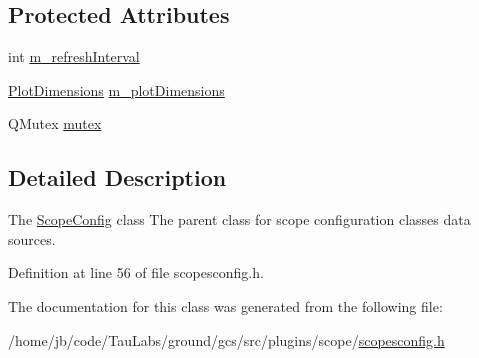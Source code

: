 \subsection*{\-Protected \-Attributes}
\begin{DoxyCompactItemize}
\item 
int \hyperlink{group___scope_plugin_gab29cf33842cdb51f7eba8bfccc93158e}{m\-\_\-refresh\-Interval}
\item 
\hyperlink{group___scope_plugin_ga51d68dee7f98e408c8929a70cc78931d}{\-Plot\-Dimensions} \hyperlink{group___scope_plugin_ga5e011996b5bbb5da0ee8b193bb5073df}{m\-\_\-plot\-Dimensions}
\item 
\-Q\-Mutex \hyperlink{group___scope_plugin_ga482a0dd2b656ddf480def36bacca8aac}{mutex}
\end{DoxyCompactItemize}


\subsection{\-Detailed \-Description}
\-The \hyperlink{class_scope_config}{\-Scope\-Config} class \-The parent class for scope configuration classes data sources. 

\-Definition at line 56 of file scopesconfig.\-h.



\-The documentation for this class was generated from the following file\-:\begin{DoxyCompactItemize}
\item 
/home/jb/code/\-Tau\-Labs/ground/gcs/src/plugins/scope/\hyperlink{scopesconfig_8h}{scopesconfig.\-h}\end{DoxyCompactItemize}
